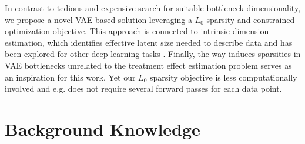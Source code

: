 \documentclass[doubleblind]{ecai}
\begin{document}
	In contrast to tedious and expensive search for suitable bottleneck dimensionality, we propose a novel VAE-based solution leveraging  a $L_0$ sparsity and constrained optimization objective.  This approach is connected to intrinsic dimension estimation, which identifies effective latent size needed to describe data and has been explored for other deep learning tasks \citep{Levina2004MaximumLE,Facco2017EstimatingTI,Gong2018OnTI,Ansuini2019IntrinsicDO,pope2021intrinsic}. 
	Finally, the way \citet{Boom2020DynamicNO} induces sparsities in VAE bottlenecks unrelated to the treatment effect estimation problem serves as an inspiration for this work. Yet our $L_0$ sparsity objective is less computationally involved and e.g. does not require several forward passes for each data point. 
	
	
	
	
	
	
	
	
	
	
	\section{Background Knowledge}
	\label{sec:background}
	
\end{document}
